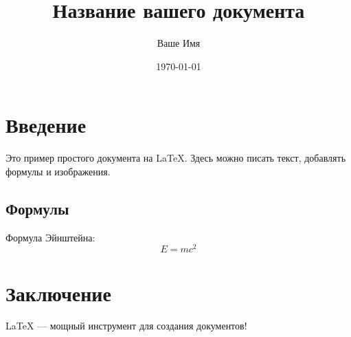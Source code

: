 \documentclass[12pt, a4paper]{article}  %
\title{Название вашего документа}      %
\author{Ваше Имя}                      %
\date{\today}                          %
\begin{document}
\maketitle                             %

\section{Введение}                     %
Это пример простого документа на LaTeX. Здесь можно писать текст, добавлять формулы и изображения.

\subsection{Формулы}                  %
Формула Эйнштейна:
$$ E = mc^2 $$


\section{Заключение}
LaTeX — мощный инструмент для создания документов!
\end{document}
